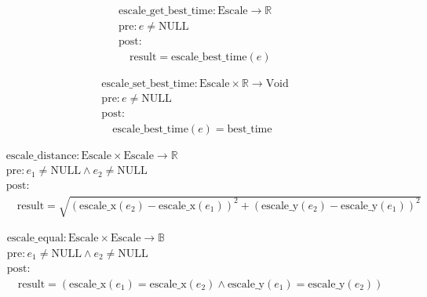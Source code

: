 \[
\begin{aligned}
&\text{escale\_get\_best\_time}: \text{Escale} \to \mathbb{R} \\
&\text{pre}: e \neq \text{NULL} \\
&\text{post}: \\
&\quad \text{result} = \text{escale\_best\_time}(e)
\end{aligned}
\]





\[
\begin{aligned}
&\text{escale\_set\_best\_time}: \text{Escale} \times \mathbb{R} \to \text{Void} \\
&\text{pre}: e \neq \text{NULL} \\
&\text{post}: \\
&\quad \text{escale\_best\_time}(e) = \text{best\_time}
\end{aligned}
\]





\[
\begin{aligned}
&\text{escale\_distance}: \text{Escale} \times \text{Escale} \to \mathbb{R} \\
&\text{pre}: e_1 \neq \text{NULL} \land e_2 \neq \text{NULL} \\
&\text{post}: \\
&\quad \text{result} = \sqrt{(\text{escale\_x}(e_2) - \text{escale\_x}(e_1))^2 + (\text{escale\_y}(e_2) - \text{escale\_y}(e_1))^2}
\end{aligned}
\]





\[
\begin{aligned}
&\text{escale\_equal}: \text{Escale} \times \text{Escale} \to \mathbb{B} \\
&\text{pre}: e_1 \neq \text{NULL} \land e_2 \neq \text{NULL} \\
&\text{post}: \\
&\quad \text{result} = (\text{escale\_x}(e_1) = \text{escale\_x}(e_2) \land \text{escale\_y}(e_1) = \text{escale\_y}(e_2))
\end{aligned}
\]
